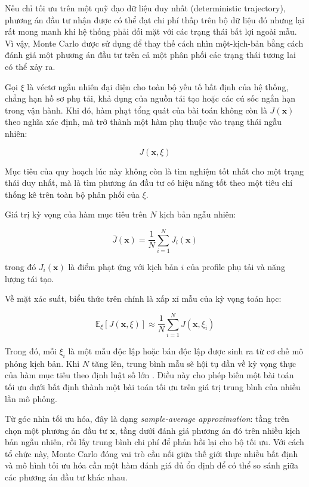 Nếu chỉ tối ưu trên một quỹ đạo dữ liệu duy nhất (deterministic trajectory), phương án đầu tư nhận được có thể đạt chi phí thấp trên bộ dữ liệu đó nhưng lại rất mong manh khi hệ thống phải đối mặt với các trạng thái bất lợi ngoài mẫu. Vì vậy, Monte Carlo được sử dụng để thay thế cách nhìn một-kịch-bản bằng cách đánh giá một phương án đầu tư trên cả một phân phối các trạng thái tương lai có thể xảy ra.

Gọi $\xi$ là véctơ ngẫu nhiên đại diện cho toàn bộ yếu tố bất định của hệ thống, chẳng hạn hồ sơ phụ tải, khả dụng của nguồn tái tạo hoặc các cú sốc ngắn hạn trong vận hành. Khi đó, hàm phạt tổng quát của bài toán không còn là $J(\mathbf{x})$ theo nghĩa xác định, mà trở thành một hàm phụ thuộc vào trạng thái ngẫu nhiên:

\begin{equation}
    J(\mathbf{x}, \xi)
\end{equation}

Mục tiêu của quy hoạch lúc này không còn là tìm nghiệm tốt nhất cho một trạng thái duy nhất, mà là tìm phương án đầu tư có hiệu năng tốt theo một tiêu chí thống kê trên toàn bộ phân phối của $\xi$.

Giá trị kỳ vọng của hàm mục tiêu trên $N$ kịch bản ngẫu nhiên:

\begin{equation}
    \bar{J}(\mathbf{x}) = \frac{1}{N} \sum_{i=1}^{N} J_i(\mathbf{x})
    \label{eq:monte_carlo}
\end{equation}

\noindent trong đó $J_i(\mathbf{x})$ là điểm phạt ứng với kịch bản $i$ của profile phụ tải và năng lượng tái tạo.

Về mặt xác suất, biểu thức trên chính là xấp xỉ mẫu của kỳ vọng toán học:

\begin{equation}
    \mathbb{E}_{\xi}[J(\mathbf{x}, \xi)] \approx \frac{1}{N} \sum_{i=1}^{N} J(\mathbf{x}, \xi_i)
    \label{eq:mc_expectation}
\end{equation}

Trong đó, mỗi $\xi_i$ là một mẫu độc lập hoặc bán độc lập được sinh ra từ cơ chế mô phỏng kịch bản. Khi $N$ tăng lên, trung bình mẫu sẽ hội tụ dần về kỳ vọng thực của hàm mục tiêu theo định luật số lớn \cite{rubinstein2016monte_carlo}. Điều này cho phép biến một bài toán tối ưu dưới bất định thành một bài toán tối ưu trên giá trị trung bình của nhiều lần mô phỏng.

Từ góc nhìn tối ưu hóa, đây là dạng \textit{sample-average approximation}: tầng trên chọn một phương án đầu tư $\mathbf{x}$, tầng dưới đánh giá phương án đó trên nhiều kịch bản ngẫu nhiên, rồi lấy trung bình chi phí để phản hồi lại cho bộ tối ưu. Với cách tổ chức này, Monte Carlo đóng vai trò cầu nối giữa thế giới thực nhiều bất định và mô hình tối ưu hóa cần một hàm đánh giá đủ ổn định để có thể so sánh giữa các phương án đầu tư khác nhau.

